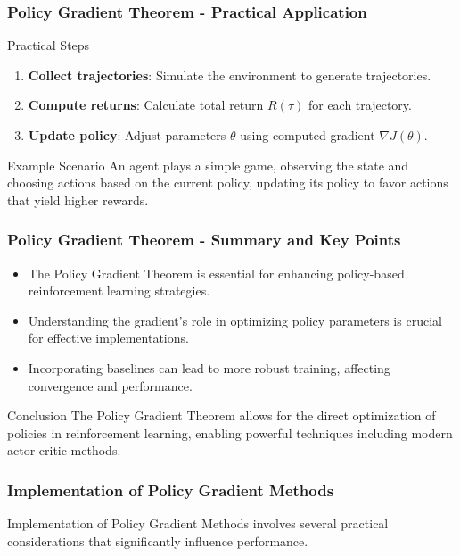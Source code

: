 \documentclass[aspectratio=169]{beamer}
\begin{document}
\begin{frame}[fragile]
    \frametitle{Policy Gradient Theorem - Practical Application}

    \begin{block}{Practical Steps}
        \begin{enumerate}
            \item \textbf{Collect trajectories}: Simulate the environment to generate trajectories.
            \item \textbf{Compute returns}: Calculate total return $R(\tau)$ for each trajectory.
            \item \textbf{Update policy}: Adjust parameters $\theta$ using computed gradient $\nabla J(\theta)$.
        \end{enumerate}
    \end{block}

    \begin{block}{Example Scenario}
        An agent plays a simple game, observing the state and choosing actions based on the current policy, updating its policy to favor actions that yield higher rewards.
    \end{block}
\end{frame}

\begin{frame}[fragile]
    \frametitle{Policy Gradient Theorem - Summary and Key Points}
    
    \begin{itemize}
        \item The Policy Gradient Theorem is essential for enhancing policy-based reinforcement learning strategies.
        \item Understanding the gradient's role in optimizing policy parameters is crucial for effective implementations.
        \item Incorporating baselines can lead to more robust training, affecting convergence and performance.
    \end{itemize}
    
    \begin{block}{Conclusion}
        The Policy Gradient Theorem allows for the direct optimization of policies in reinforcement learning, enabling powerful techniques including modern actor-critic methods.
    \end{block}
\end{frame}

\begin{frame}
    \frametitle{Implementation of Policy Gradient Methods}
    Implementation of Policy Gradient Methods involves several practical considerations that significantly influence performance.
\end{frame}
\end{document}
